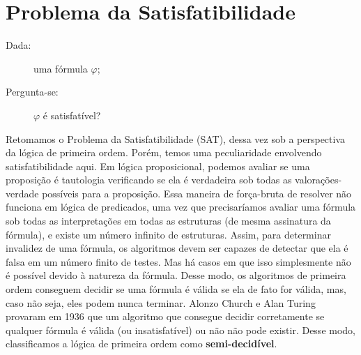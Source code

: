\chapter{Problema da Satisfatibilidade}

\begin{description}
    \item[Dada:] uma fórmula $\varphi$;
    \item[Pergunta-se:] $\varphi$ é satisfatível? 
\end{description}

Retomamos o Problema da Satisfatibilidade (SAT), dessa vez sob a perspectiva da lógica de primeira ordem. Porém, temos uma peculiaridade envolvendo satisfatibilidade aqui. Em lógica proposicional, podemos avaliar se uma proposição é tautologia verificando se ela é verdadeira sob todas as valorações-verdade possíveis para a proposição. Essa maneira de força-bruta de resolver não funciona em lógica de predicados, uma vez que precisaríamos avaliar uma fórmula sob todas as interpretações em todas as estruturas (de mesma assinatura da fórmula), e existe um número infinito de estruturas. Assim, para determinar invalidez de uma fórmula, os algoritmos devem ser capazes de detectar que ela é falsa em um número finito de testes. Mas há casos em que isso simplesmente não é possível devido à natureza da fórmula. Desse modo, os algoritmos de primeira ordem conseguem decidir se uma fórmula é válida se ela de fato for válida, mas, caso não seja, eles podem nunca terminar. Alonzo Church e Alan Turing provaram em 1936 que um algoritmo que consegue decidir corretamente se qualquer fórmula é válida (ou insatisfatível) ou não não pode existir. Desse modo, classificamos a lógica de primeira ordem como \textbf{semi-decidível}.

